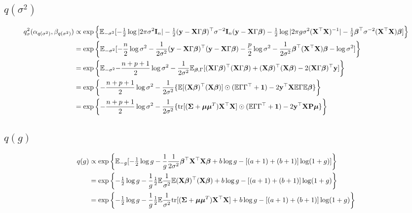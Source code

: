 \documentclass{amsart}[12pt]
\begin{document}
\subsection{$q(\sigma^2)$}
\begin{align*}
	q_\sigma^2(\alpha_{q(\sigma^2)}, \beta_{q(\sigma^2)}) & \propto \exp \left\{ \mathbb{E}_{-\sigma^2} [-\tfrac{1}{2} \log |2 \pi \sigma^2 {\bf I}_n| - \tfrac{1}{2} ({\bf y} - {\bf X} \Gamma {\boldsymbol\beta})^\top \sigma^{-2} {\bf I}_n ({\bf y} - {\bf X} \Gamma {\boldsymbol\beta}) - \tfrac{1}{2} \log |2 \pi g \sigma^2 ({\bf X}^\top {\bf X})^{-1}| - \tfrac{1}{2} {\boldsymbol \beta}^\top \sigma^{-2} ({\bf X}^\top {\bf X}) {\boldsymbol \beta}]  \right\} \\
	                                                      & = \exp \left\{ \mathbb{E}_{-\sigma^2} [- \frac{n}{2} \log \sigma^2 - \frac{1}{2 \sigma^2}({\bf y} - {\bf X} \Gamma {\boldsymbol\beta})^\top({\bf y} - {\bf X} \Gamma {\boldsymbol\beta}) - \frac{p}{2} \log \sigma^2 - \frac{1}{2 \sigma^2} {\boldsymbol \beta}^\top ({\bf X}^\top {\bf X}) {\boldsymbol \beta} - \log \sigma^2]  \right\}                        \\
	                                                      & = \exp \left\{ \mathbb{E}_{-\sigma^2} {-\frac{n + p + 1}{2} \log \sigma^2 - \frac{1}{2\sigma^2} \mathbb{E}_{{\boldsymbol \beta}, \Gamma} [({\bf X} \Gamma {\boldsymbol\beta})^\top ({\bf X} \Gamma {\boldsymbol\beta}) + ({\bf X} {\boldsymbol \beta})^\top ({\bf X} {\boldsymbol \beta}) - 2 ({\bf X} \Gamma {\boldsymbol\beta})^\top {\bf y}]}  \right\}                                         \\
	                                                      & = \exp \left\{ -\frac{n + p + 1}{2} \log \sigma^2 - \frac{1}{2 \sigma^2} \{\mathbb{E} [({\bf X} {\boldsymbol \beta})^\top ({\bf X} {\boldsymbol \beta})] \odot (\mathbb{E} \Gamma \Gamma^\top + {\bf 1}) - 2{\bf y}^\top {\bf X} \mathbb{E} \Gamma \mathbb{E} {\boldsymbol \beta}\} \right\}                                                                             \\
	                                                      & = \exp \left\{ -\frac{n + p + 1}{2} \log \sigma^2 - \frac{1}{2 \sigma^2} \{\text{tr}[({\boldsymbol \Sigma} + {\boldsymbol \mu} {\boldsymbol \mu}^T) {\bf X}^\top {\bf X}] \odot (\mathbb{E} \Gamma \Gamma^\top + {\bf 1}) - 2{\bf y}^\top {\bf X} {\bf P} {\boldsymbol\mu}\} \right\}                                                                                  \\
\end{align*}

\subsection{$q(g)$}
\begin{align*}
	q(g) & \propto \exp \left\{ \mathbb{E}_{-g} [-\tfrac{1}{2} \log g - \frac{1}{g} \frac{1}{2 \sigma^2} {\boldsymbol \beta}^\top {\bf X}^\top {\bf X} {\boldsymbol\beta} + b \log g - [(a + 1) + (b + 1)] \log(1 + g)] \right\}  \\
	     & = \exp \left\{ -\tfrac{1}{2} \log g - \frac{1}{g} \tfrac{1}{2} \mathbb{E} \frac{1}{\sigma^2} \mathbb{E} ({\bf X} {\boldsymbol \beta})^\top ({\bf X} {\boldsymbol \beta}) + b \log g - [(a + 1) + (b + 1)] \log(1 + g) \right\}         \\
	     & = \exp \left\{ -\tfrac{1}{2} \log g - \frac{1}{g} \tfrac{1}{2} \mathbb{E} \frac{1}{\sigma^2} \text{tr}[({\boldsymbol \Sigma} + {\boldsymbol \mu} {\boldsymbol \mu}^T) {\bf X}^\top {\bf X}] + b \log g - [(a + 1) + (b + 1)] \log(1 + g) \right\} \\
\end{align*}
\end{document}
